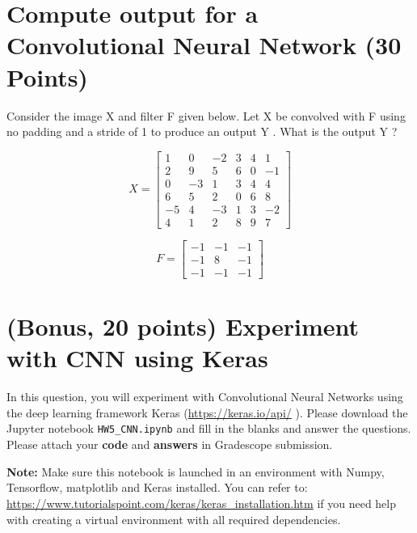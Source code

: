 \documentclass[12pt]{article}%
\begin{document}
\newpage
\section{Compute output for a Convolutional Neural Network (30 Points)}
Consider the image X and filter F given below. Let X be convolved with F
using no padding and a stride of 1 to produce an output Y . What is the
output Y ?

\begin{equation*}
    X = \begin{bmatrix}
        1 & 0 & -2 & 3 & 4 & 1\\
        2 & 9 & 5 & 6 & 0 & -1\\
        0 & -3 & 1 & 3 & 4 & 4\\
        6 & 5 & 2 & 0 & 6 & 8\\
        -5 & 4 & -3 & 1 & 3 & -2\\
        4 & 1 & 2 & 8 & 9 & 7
        \end{bmatrix}
\end{equation*}

\begin{equation*}
    F = \begin{bmatrix}
        -1 & -1 & -1\\
        -1 & 8 & -1 \\
        -1 & -1 & -1
        \end{bmatrix}
\end{equation*}




\newpage
\section{(\textbf{Bonus}, 20 points) Experiment with CNN using Keras}

In this question, you will experiment with Convolutional Neural Networks using the deep learning framework Keras (\url{https://keras.io/api/} ). Please download the Jupyter notebook \texttt{HW5\_CNN.ipynb} and fill in the blanks and answer the questions.  Please attach your \textbf{code} and \textbf{answers} in Gradescope submission.

\textbf{Note: } Make sure this notebook is launched in an environment with Numpy, Tensorflow, matplotlib and Keras installed. You can refer to: \url{https://www.tutorialspoint.com/keras/keras_installation.htm} if you need help with creating a virtual environment with all required dependencies.


\newpage
\end{document}
